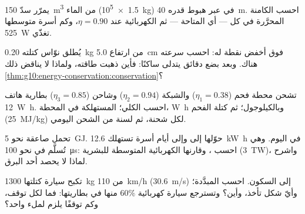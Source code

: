 \begin{exercise}[$\star\star$]\label{exo:g10:energy-conservation:10}
يمرّر سدّ \qty{150}{m^3} من الماء (\qty{1.5e5}{kg}) في 
عبر هبوط قدره \qty{40}{m}. احسب  الكامنة المحرَّرة في كل
 --- أي  المتاحة --- ثم  الكهربائية عند
$\eta = 0.90$، وكم أسرة متوسطها \qty{525}{W} تغذّي.
\end{exercise}

\begin{exercise}[$\star\star$]\label{exo:g10:energy-conservation:11}
يُطلق نوّاس كتلته \qty{0.20}{kg} من ارتفاع \qty{5.0}{cm} فوق
أخفض نقطة له: احسب سرعته هناك. وبعد بضع دقائق يتدلى
ساكنًا: فأين ذهبت طاقته، ولماذا لا يناقض ذلك
\cref{thm:g10:energy-conservation:conservation}؟
\end{exercise}

\begin{exercise}[$\star\star\star$]\label{exo:g10:energy-conservation:12}
تشحن محطة فحم ($\eta_1 = 0.38$) والشبكة ($\eta_2 = 0.94$) وشاحن
($\eta_3 = 0.85$) بطارية هاتف \qty{12}{W.h}.
احسب  الكلي؛  المستهلكة في
المحطة،  \unit{W.h} وبالكيلوجول؛ ثم كتلة الفحم (\qty{25}{MJ/kg})
لكل شحنة، ثم لسنة من الشحن اليومي.
\end{exercise}

\begin{exercise}[$\star\star\star$]\label{exo:g10:energy-conservation:13}
تحمل صاعقة نحو \qty{5}{GJ}. حوّلها إلى
 وإلى أيام أسرة تستهلك \qty{12.6}{kW.h} في اليوم.
وهي تُسلَّم في نحو \qty{100}{\micro s}: احسب ،
وقارنها  الكهربائية المتوسطة للبشرية (\qty{3}{TW})،
واشرح لماذا لا يحصد أحد البرق.
\end{exercise}

\begin{exercise}[$\star\star\star$]\label{exo:g10:energy-conservation:14}
تكبح سيارة كتلتها \qty{1300}{kg} من \qty{110}{km/h} (\qty{30.6}{m/s})
إلى السكون. احسب  المبدَّدة؛ وأيّ شكل تأخذ،
وأين؟ وتسترجع سيارة كهربائية $60\%$ منها في بطاريتها:
فما  لكل توقف، وكم توقفًا يلزم لملء  واحد؟
\end{exercise}

